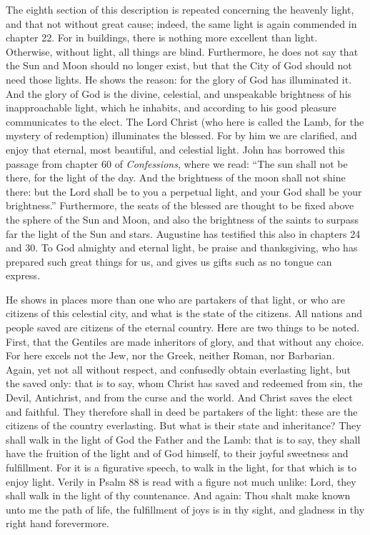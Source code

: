 The eighth section of this description is repeated concerning the heavenly light, and that not without great cause; indeed, the same light is again commended in chapter 22. For in buildings, there is nothing more excellent than light. Otherwise, without light, all things are blind. Furthermore, he does not say that the Sun and Moon should no longer exist, but that the City of God should not need those lights. He shows the reason: for the glory of God has illuminated it. And the glory of God is the divine, celestial, and unspeakable brightness of his inapproachable light, which he inhabits, and according to his good pleasure communicates to the elect. The Lord Christ (who here is called the Lamb, for the mystery of redemption) illuminates the blessed. For by him we are clarified, and enjoy that eternal, most beautiful, and celestial light. John has borrowed this passage from chapter 60 of \textit{Confessions}, where we read: “The sun shall not be there, for the light of the day. And the brightness of the moon shall not shine there: but the Lord shall be to you a perpetual light, and your God shall be your brightness.” Furthermore, the seats of the blessed are thought to be fixed above the sphere of the Sun and Moon, and also the brightness of the saints to surpass far the light of the Sun and stars. Augustine has testified this also in chapters 24 and 30. To God almighty and eternal light, be praise and thanksgiving, who has prepared such great things for us, and gives us gifts such as no tongue can express.

He shows in places more than one who are partakers of that light, or who are citizens of this celestial city, and what is the state of the citizens. All nations and people saved are citizens of the eternal country. Here are two things to be noted. First, that the Gentiles are made inheritors of glory, and that without any choice. For here excels not the Jew, nor the Greek, neither Roman, nor Barbarian. Again, yet not all without respect, and confusedly obtain everlasting light, but the saved only: that is to say, whom Christ has saved and redeemed from sin, the Devil, Antichrist, and from the curse and the world. And Christ saves the elect and faithful. They therefore shall in deed be partakers of the light: these are the citizens of the country everlasting. But what is their state and inheritance? They shall walk in the light of God the Father and the Lamb: that is to say, they shall have the fruition of the light and of God himself, to their joyful sweetness and fulfillment. For it is a figurative speech, to walk in the light, for that which is to enjoy light. Verily in Psalm 88 is read with a figure not much unlike: Lord, they shall walk in the light of thy countenance. And again: Thou shalt make known unto me the path of life, the fulfillment of joys is in thy sight, and gladness in thy right hand forevermore.

